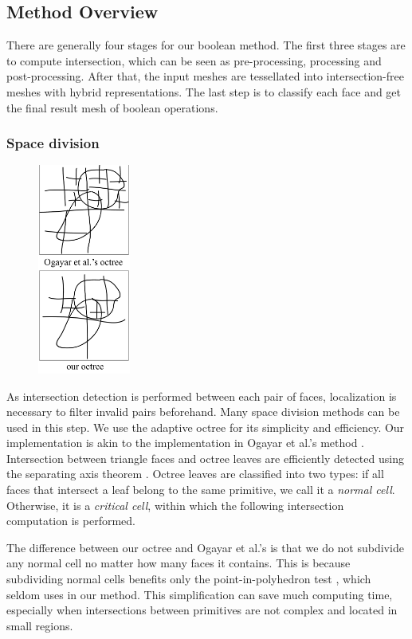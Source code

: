 \documentclass[10pt,journal,compsoc]{IEEEtran}
\begin{document}
\fi
\subsection{Method Overview}

There are generally four stages for our boolean method. The first three stages are to compute intersection, which can be seen as pre-processing, processing and post-processing. After that, the input meshes are tessellated into intersection-free meshes with hybrid representations. The last step is to classify each face and get the final result mesh of boolean operations.

\subsubsection{Space division}


\begin{figure}
\includegraphics[width=1.2in]{octreediff}
\end{figure}

As intersection detection is performed between each pair of faces, localization is necessary to filter invalid pairs beforehand. Many space division methods can be used in this step. We use the adaptive octree for its simplicity and efficiency. Our implementation is akin to the implementation in Ogayar et al.'s method \cite{ogayar2015deferred}. Intersection between triangle faces and octree leaves are efficiently detected using the separating axis theorem \cite{gottschalk1996obbtree}. Octree leaves are classified into two types: if all faces that intersect a leaf belong to the same primitive, we call it a \emph{normal cell}. Otherwise, it is a \emph{critical cell}, within which the following intersection computation is performed.


The difference between our octree and Ogayar et al.'s is that we do not subdivide any normal cell no matter how many faces it contains. This is because subdividing normal cells benefits only the point-in-polyhedron test  \cite{frisken2002simple}, which seldom uses in our method. This simplification can save much computing time, especially when intersections between primitives are not complex and located in small regions.
\end{document}

